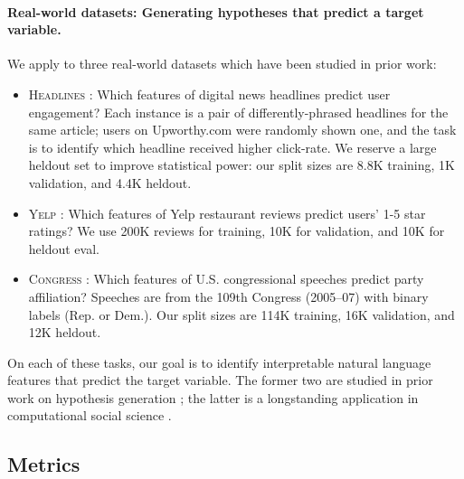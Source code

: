 \paragraph{Real-world datasets: Generating hypotheses that predict a target variable.} 
We apply \ourmethod to three real-world datasets which have been studied in prior work:
\begin{itemize}
    \item \textsc{Headlines} \cite{matias_upworthy_2021}: Which features of digital news headlines predict user engagement?
    Each instance is a pair of differently-phrased headlines for the same article; users on Upworthy.com were randomly shown one, and the task is to identify which headline received higher click-rate.
    We reserve a large heldout set to improve statistical power: our split sizes are 8.8K training, 1K  validation, and 4.4K heldout.
    \item \textsc{Yelp} \citep{yelp_yelp_2024}: Which features of Yelp restaurant reviews predict users' 1-5 star ratings? We use 200K reviews for training, 10K for validation, and 10K for heldout eval. 
    \item \textsc{Congress} \citep{gentzkow_what_2010}: Which features of U.S. congressional speeches predict party affiliation?
    Speeches are from the 109th Congress (2005--07) with binary labels (Rep. or Dem.). 
    Our split sizes are 114K training, 16K validation, and 12K heldout.
\end{itemize}

On each of these tasks, our goal is to identify interpretable natural language features that predict the target variable.
The former two are studied in prior work on hypothesis generation \citep{zhou_hypothesis_2024, batista_words_2024, ludan_interpretabledesign_2024}; the latter is a longstanding application in computational social science \citep{grimmer_machine_2021}.



\subsection{Metrics}
\label{sec:metrics}

